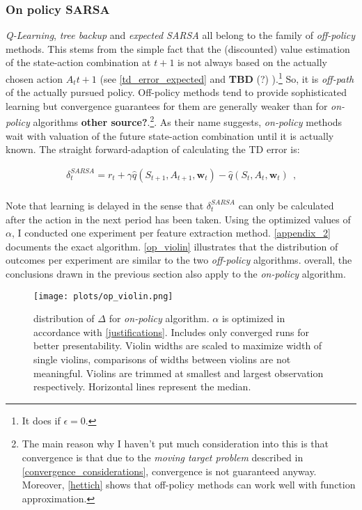 \subsubsection{On policy SARSA}
\emph{Q-Learning}, \emph{tree backup} and \emph{expected SARSA} all belong to the family of \emph{off-policy} methods. This stems from the simple fact that the (discounted) value estimation of the state-action combination at $t+1$ is not always based on the actually chosen action $A_t{t+1}$ (see \autoref{td_error_expected} and \textbf{TBD} (?) ).\footnote{It does if $\epsilon = 0$.}  So, it is \emph{off-path} of the actually pursued policy. Off-policy methods tend to provide sophisticated learning but convergence guarantees for them are generally weaker than for \emph{on-policy} algorithms \parencite{sutton_reinforcement_2018} \textbf{other source?}.\footnote{The main reason why I haven't put much consideration into this is that convergence is that due to the \emph{moving target problem} described in \autoref{convergence_considerations}, convergence is not guaranteed anyway. Moreover, \autoref{hettich} shows that off-policy methods can work well with function approximation.}. As their name suggests, \emph{on-policy} methods wait with valuation of the future state-action combination until it is actually known. The straight forward-adaption of calculating the TD error is:

\begin{gather}\label{td_error_on_policy}
\delta_t^{SARSA} = r_t + \gamma \hat{q}(S_{t+1}, A_{t+1}, \boldsymbol{w}_t) - \hat{q}(S_t, A_t, \boldsymbol{w}_t) ~~ \text{,} \\
\end{gather}

Note that learning is delayed in the sense that $\delta_t^{SARSA}$ can only be calculated after the action in the next period has been taken. Using the optimized values of $\alpha$, I conducted one experiment per feature extraction method. \autoref{appendix_2} documents the exact algorithm. \autoref{op_violin} illustrates that the distribution of outcomes per experiment are similar to the two \emph{off-policy} algorithms. overall, the conclusions drawn in the previous section also apply to the \emph{on-policy} algorithm.

\begin{figure}
	\texttt{[image: plots/op\_violin.png]}
	\caption{distribution of $\Delta$ for \emph{on-policy} algorithm. $\alpha$ is optimized in accordance with \autoref{justifications}. Includes only converged runs for better presentability. Violin widths are scaled to maximize width of single violins, comparisons of widths between violins are not meaningful. Violins are trimmed at smallest and largest observation respectively. Horizontal lines represent the median.}
	\label{op_violin}
\end{figure}

